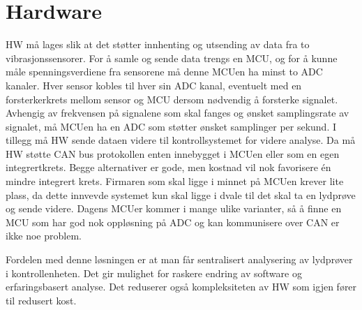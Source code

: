 \section{Hardware}

HW må lages slik at det støtter innhenting og utsending av data fra to vibrasjonssensorer. 
For å samle og sende data trengs en MCU, og for å kunne måle spenningsverdiene fra sensorene
må denne MCUen ha minst to ADC kanaler. Hver sensor kobles til hver sin ADC kanal, eventuelt
med en forsterkerkrets mellom sensor og MCU dersom nødvendig å forsterke signalet.
Avhengig av frekvensen på signalene som skal fanges og ønsket samplingsrate av signalet, må 
MCUen ha en ADC som støtter ønsket samplinger per sekund. I tillegg må HW sende dataen 
videre til kontrollsystemet for videre analyse. Da må HW støtte CAN bus protokollen enten innebygget
i MCUen eller som en egen integrertkrets. Begge alternativer er gode, men kostnad vil nok favorisere
én mindre integrert krets. Firmaren \cite{firmware} som skal ligge i minnet på MCUen krever lite plass, 
da dette innvevde systemet \cite{embedded} kun skal ligge i dvale til det skal ta en lydprøve og sende 
videre. Dagens MCUer kommer i mange
ulike varianter, så å finne en MCU som har god nok oppløsning på ADC og kan kommunisere over CAN
er ikke noe problem. 

Fordelen med denne løsningen er at man får sentralisert analysering av lydprøver i kontrollenheten.
Det gir mulighet for raskere endring av software og erfaringsbasert analyse. Det reduserer også kompleksiteten
av HW som igjen fører til redusert kost. 